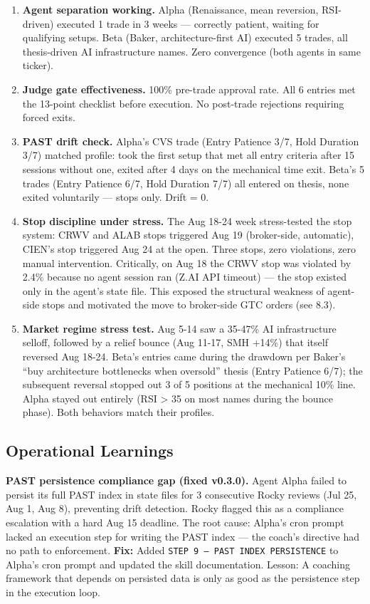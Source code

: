 \documentclass[11pt]{article}
\begin{document}
\begin{enumerate}
\def\labelenumi{\arabic{enumi}.}
\item
  \textbf{Agent separation working.} Alpha (Renaissance, mean reversion, RSI-driven) executed 1 trade in 3 weeks --- correctly patient, waiting for qualifying setups. Beta (Baker, architecture-first AI) executed 5 trades, all thesis-driven AI infrastructure names. Zero convergence (both agents in same ticker).
\item
  \textbf{Judge gate effectiveness.} 100\% pre-trade approval rate. All 6 entries met the 13-point checklist before execution. No post-trade rejections requiring forced exits.
\item
  \textbf{PAST drift check.} Alpha's CVS trade (Entry Patience 3/7, Hold Duration 3/7) matched profile: took the first setup that met all entry criteria after 15 sessions without one, exited after 4 days on the mechanical time exit. Beta's 5 trades (Entry Patience 6/7, Hold Duration 7/7) all entered on thesis, none exited voluntarily --- stops only. Drift = 0.
\item
  \textbf{Stop discipline under stress.} The Aug 18-24 week stress-tested the stop system: CRWV and ALAB stops triggered Aug 19 (broker-side, automatic), CIEN's stop triggered Aug 24 at the open. Three stops, zero violations, zero manual intervention. Critically, on Aug 18 the CRWV stop was violated by 2.4\% because no agent session ran (Z.AI API timeout) --- the stop existed only in the agent's state file. This exposed the structural weakness of agent-side stops and motivated the move to broker-side GTC orders (see 8.3).
\item
  \textbf{Market regime stress test.} Aug 5-14 saw a 35-47\% AI infrastructure selloff, followed by a relief bounce (Aug 11-17, SMH +14\%) that itself reversed Aug 18-24. Beta's entries came during the drawdown per Baker's ``buy architecture bottlenecks when oversold'' thesis (Entry Patience 6/7); the subsequent reversal stopped out 3 of 5 positions at the mechanical 10\% line. Alpha stayed out entirely (RSI \textgreater{} 35 on most names during the bounce phase). Both behaviors match their profiles.
\end{enumerate}

\subsection{Operational Learnings}\label{operational-learnings}

\textbf{PAST persistence compliance gap (fixed v0.3.0).} Agent Alpha failed to persist its full PAST index in state files for 3 consecutive Rocky reviews (Jul 25, Aug 1, Aug 8), preventing drift detection. Rocky flagged this as a compliance escalation with a hard Aug 15 deadline. The root cause: Alpha's cron prompt lacked an execution step for writing the PAST index --- the coach's directive had no path to enforcement. \textbf{Fix:} Added \texttt{STEP\ 9\ —\ PAST\ INDEX\ PERSISTENCE} to Alpha's cron prompt and updated the skill documentation. Lesson: A coaching framework that depends on persisted data is only as good as the persistence step in the execution loop.
\end{document}
